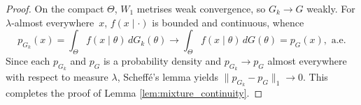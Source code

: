 \documentclass[10pt,a4paper]{amsart}
\begin{document}
\begin{proof}
On the compact $\Theta$, $W_1$ metrises weak convergence, so $G_k\to G$ weakly. For $\lambda$-almost everywhere\ $x$,
$f(x\mid\cdot)$ is bounded and continuous, whence 
\begin{equation*}
    p_{G_k}(x)=\int_\Theta f(x\mid\theta)\,dG_k(\theta)\to
\int_\Theta f(x\mid\theta)\,dG(\theta)=p_G(x), \text{ a.e.}
\end{equation*}
Since each $p_{G_k}$ and $p_G$ is a probability density and $p_{G_k} \to p_G$ almost everywhere with respect to measure $\lambda$, Scheffé's lemma yields
$\|p_{G_k}-p_G\|_1\to0$. This completes the proof of Lemma \ref{lem:mixture_continuity}. 
\end{proof}
\end{document}
